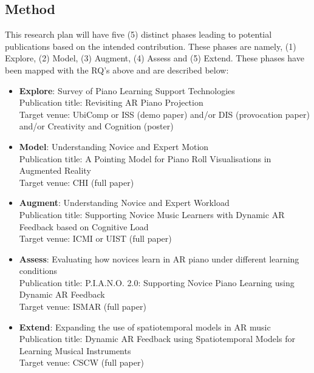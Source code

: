 \documentclass[manuscript,screen]{acmart}
\begin{document}
\subsection{Method}
This research plan will have five (5) distinct phases leading to potential publications based on the intended contribution. These phases are namely, (1) Explore, (2) Model, (3) Augment, (4) Assess and (5) Extend. These phases have been mapped with the RQ's above and are described below: 
\begin{itemize}
    \item \textbf{Explore}: Survey of Piano Learning Support Technologies\\
    Publication title: Revisiting AR Piano Projection\\
    Target venue: UbiComp or ISS (demo paper) and/or DIS (provocation paper) and/or Creativity and Cognition (poster)
    \item \textbf{Model}: Understanding Novice and Expert Motion\\
    Publication title: A Pointing Model for Piano Roll Visualisations in Augmented Reality\\
    Target venue: CHI (full paper)
    \item \textbf{Augment}: Understanding Novice and Expert Workload\\
    Publication title: Supporting Novice Music Learners with Dynamic AR Feedback based on Cognitive Load\\
    Target venue: ICMI or UIST (full paper)
    \item \textbf{Assess}: Evaluating how novices learn in AR piano under different learning conditions\\
    Publication title: P.I.A.N.O. 2.0: Supporting Novice Piano Learning using Dynamic AR Feedback\\
    Target venue: ISMAR (full paper)
    \item \textbf{Extend}: Expanding the use of spatiotemporal models in AR music\\
    Publication title: Dynamic AR Feedback using Spatiotemporal Models for Learning Musical Instruments\\
    Target venue: CSCW (full paper)
\end{itemize}
\end{document}
